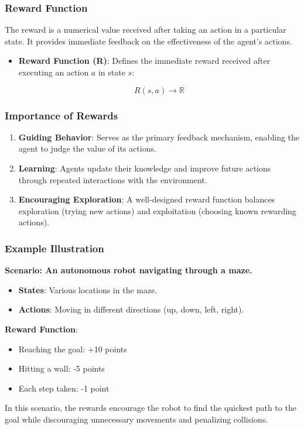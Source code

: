 \documentclass[aspectratio=169]{beamer}
\begin{document}
\begin{frame}[fragile]
    \frametitle{Reward Function}
    
    The reward is a numerical value received after taking an action in a particular state. It provides immediate feedback on the effectiveness of the agent's actions.
    
    \begin{itemize}
        \item \textbf{Reward Function (R)}: Defines the immediate reward received after executing an action \( a \) in state \( s \):
        
        \[
        R(s, a) \rightarrow \mathbb{R}
        \]
    \end{itemize}
\end{frame}

\begin{frame}[fragile]
    \frametitle{Importance of Rewards}
    
    \begin{enumerate}
        \item \textbf{Guiding Behavior}: Serves as the primary feedback mechanism, enabling the agent to judge the value of its actions.
        \item \textbf{Learning}: Agents update their knowledge and improve future actions through repeated interactions with the environment.
        \item \textbf{Encouraging Exploration}: A well-designed reward function balances exploration (trying new actions) and exploitation (choosing known rewarding actions).
    \end{enumerate}
\end{frame}

\begin{frame}[fragile]
    \frametitle{Example Illustration}
    
    \textbf{Scenario: An autonomous robot navigating through a maze.}
    
    \begin{itemize}
        \item \textbf{States}: Various locations in the maze.
        \item \textbf{Actions}: Moving in different directions (up, down, left, right).
    \end{itemize}
    
    \textbf{Reward Function}:
    \begin{itemize}
        \item Reaching the goal: +10 points
        \item Hitting a wall: -5 points
        \item Each step taken: -1 point
    \end{itemize}
    
    \vspace{3mm} %
    In this scenario, the rewards encourage the robot to find the quickest path to the goal while discouraging unnecessary movements and penalizing collisions.
\end{frame}
\end{document}

